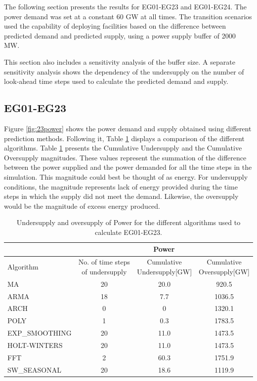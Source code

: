 \documentclass[11pt,letterpaper]{article}
\begin{document}
The following section presents the results for EG01-EG23 and EG01-EG24. The power demand was set at a constant 60 GW at all times. The transition scenarios used the capability of deploying facilities based on the difference between predicted demand and predicted supply, using a power supply buffer of 2000 MW. 

This section also includes a sensitivity analysis of the buffer size. A separate sensitivity analysis shows the dependency of the undersupply on the number of look-ahead time steps used to calculate the predicted demand and supply.

\subsection{EG01-EG23}

Figure \ref{fig:23power} shows the power demand and supply obtained using different prediction methods. Following it, Table \ref{tab:23-power} displays a comparison of the different algorithms. Table \ref{tab:23-power} presents the Cumulative Undersupply and the Cumulative Oversupply magnitudes. These values represent the summation of the difference between the power supplied and the power demanded for all the time steps in the simulation. This magnitude could best be thought of as energy. For undersupply conditions, the magnitude represents lack of energy provided during the time steps in which the supply did not meet the demand. Likewise, the oversupply would be the magnitude of excess energy produced.

\begin{table}[!h]
	\centering
	\caption {Undersupply and oversupply of Power for the different algorithms used to calculate EG01-EG23.}
	\label{tab:23-power}
	\begin{tabular}{|l|c|c|c|}
		\hline
		& \multicolumn{3}{c|}{Power} \\ \hline
		Algorithm & \shortstack{No. of time steps\\of undersupply}  & 
		\shortstack{Cumulative\\Undersupply[GW]}  & \shortstack{Cumulative\\Oversupply[GW]} \\ \hline
		MA        & 20 	& 20.0  &  920.5   \\ \hline
		ARMA      & 18 	&  7.7  &  1036.5  \\ \hline
		ARCH      &  0 	&   0  	&  1320.1  \\ \hline
		POLY      &  1 	&  0.3 	&  1783.5  \\ \hline
		EXP\_SMOOTHING 	& 20 	& 11.0 & 1473.5 \\ \hline
		HOLT-WINTERS  	& 20 	& 11.0 & 1473.5 \\ \hline
		FFT       & 2 	& 60.3 	& 1751.9 	\\ \hline
		SW\_SEASONAL    & 20 	& 18.6 	& 1119.9 	\\ \hline
	\end{tabular}
\end{table}
\end{document}
